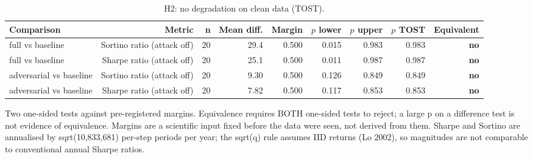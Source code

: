 \begin{table}[htbp]
  \centering
  \caption{H2: no degradation on clean data (TOST).}
  \label{tab:equivalence}
  \begin{tabular}{lrrrrrrrr}
    \toprule
    Comparison & Metric & n & Mean diff. & Margin & $p$ lower & $p$ upper & $p$ TOST & Equivalent \\
    \midrule
    full vs baseline & Sortino ratio (attack off) & 20 & 29.4 & 0.500 & 0.015 & 0.983 & 0.983 & \textbf{no} \\
    full vs baseline & Sharpe ratio (attack off) & 20 & 25.1 & 0.500 & 0.011 & 0.987 & 0.987 & \textbf{no} \\
    adversarial vs baseline & Sortino ratio (attack off) & 20 & 9.30 & 0.500 & 0.126 & 0.849 & 0.849 & \textbf{no} \\
    adversarial vs baseline & Sharpe ratio (attack off) & 20 & 7.82 & 0.500 & 0.117 & 0.853 & 0.853 & \textbf{no} \\
    \bottomrule
  \end{tabular}
  \begin{minipage}{\linewidth}\vspace{4pt}\footnotesize Two one-sided tests against pre-registered margins. Equivalence requires BOTH one-sided tests to reject; a large p on a difference test is not evidence of equivalence. Margins are a scientific input fixed before the data were seen, not derived from them. Sharpe and Sortino are annualised by sqrt(10,833,681) per-step periods per year; the sqrt(q) rule assumes IID returns (Lo 2002), so magnitudes are not comparable to conventional annual Sharpe ratios.\end{minipage}
\end{table}
